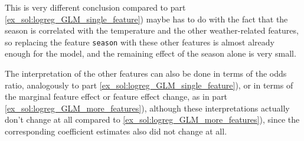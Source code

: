 {\begin{enumerate}[a)]
    This is very different conclusion compared to part \ref{ex_sol:logreg_GLM_single_feature})
    maybe has to do with the fact that the season is correlated with the temperature and the other weather-related features, so replacing the feature \texttt{season} with these other features is almost already enough for the model, and the remaining effect of the season alone is very small.

    The interpretation of the other features can also be done in terms of the odds ratio, analogously to part \ref{ex_sol:logreg_GLM_single_feature}), or in terms of the marginal feature effect or feature effect change, as in part \ref{ex_sol:logreg_GLM_more_features}), although these interpretations actually don't change at all compared to \ref{ex_sol:logreg_GLM_more_features}), since the corresponding coefficient estimates also did not change at all.

\end{enumerate}
}
